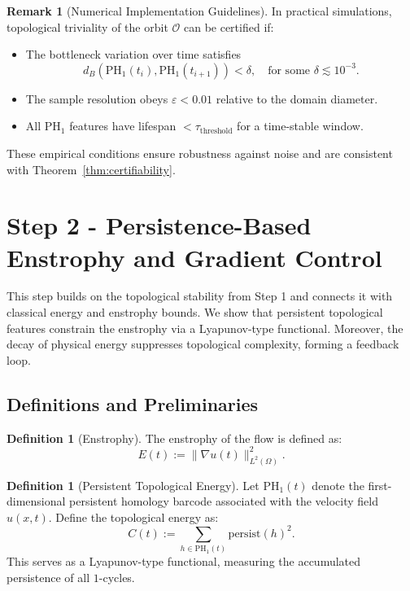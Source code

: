 \documentclass[11pt]{article}
\theoremstyle{definition}
\newtheorem{definition}[theorem]{Definition}
\newtheorem{remark}[theorem]{Remark}
\begin{document}
\begin{remark}[Numerical Implementation Guidelines]
In practical simulations, topological triviality of the orbit $\mathcal{O}$ can be certified if:
\begin{itemize}
    \item The bottleneck variation over time satisfies
    \[
    d_B(\mathrm{PH}_1(t_i), \mathrm{PH}_1(t_{i+1})) < \delta, \quad \text{for some } \delta \lesssim 10^{-3}.
    \]
    \item The sample resolution obeys $\varepsilon < 0.01$ relative to the domain diameter.
    \item All $\mathrm{PH}_1$ features have lifespan $< \tau_\text{threshold}$ for a time-stable window.
\end{itemize}
These empirical conditions ensure robustness against noise and are consistent with Theorem~\ref{thm:certifiability}.
\end{remark}


\section{Step 2 - Persistence-Based Enstrophy and Gradient Control}

This step builds on the topological stability from Step 1 and connects it with classical energy and enstrophy bounds. We show that persistent topological features constrain the enstrophy via a Lyapunov-type functional. Moreover, the decay of physical energy suppresses topological complexity, forming a feedback loop.

\subsection{Definitions and Preliminaries}

\begin{definition}[Enstrophy]
The enstrophy of the flow is defined as:
\[
E(t) := \|\nabla u(t)\|_{L^2(\Omega)}^2.
\]
\end{definition}

\begin{definition}[Persistent Topological Energy]
Let $\mathrm{PH}_1(t)$ denote the first-dimensional persistent homology barcode associated with the velocity field $u(x,t)$. Define the topological energy as:
\[
C(t) := \sum_{h \in \mathrm{PH}_1(t)} \mathrm{persist}(h)^2.
\]
This serves as a Lyapunov-type functional, measuring the accumulated persistence of all $1$-cycles.
\end{definition}
\end{document}
